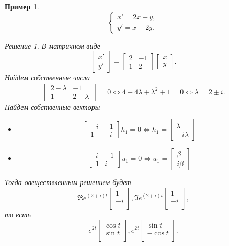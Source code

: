 \documentclass[a5paper, 11pt]{article}
\theoremstyle{definition}
\theoremstyle{plain}
\newtheorem{Ex}{Пример}
\theoremstyle{remark}
\newtheorem*{Solution}{Решение}
\begin{document}
	\begin{Ex}
		\[
		\begin{cases}
		x' = 2x-y, \\
		y'=x+2y.
	\end{cases}
		\]
		\begin{Solution}
			В матричном виде
			\[
			\begin{bmatrix}
				x'\\y'
			\end{bmatrix} = 
		\begin{bmatrix}
			2 & -1\\
			1 & 2
		\end{bmatrix}
	\begin{bmatrix}
		x\\ y
	\end{bmatrix}.
			\]
			Найдем собственные числа 
			\[
			\begin{vmatrix}
				2-\lambda & -1\\
				1 & 2-\lambda
			\end{vmatrix} = 0 \Leftrightarrow 
			4-4\lambda + \lambda^2 + 1 = 0 \Leftrightarrow \lambda = 2 \pm i.
			\]
			Найдем собственные векторы
			\begin{itemize}
				\item[$\boxed{\lambda=2+i}$] 
				\[
				\begin{bmatrix}
				-i & -1\\
				1 & -i
				\end{bmatrix}h_1 = 0 \Leftrightarrow h_1 = \begin{bmatrix}
				\lambda\\
				-i\lambda 
				\end{bmatrix}
				\]			
							\item[$\boxed{\lambda=2-i}$] 
				\[
				\begin{bmatrix}
				i & -1\\
				1 & i
				\end{bmatrix}u_1 = 0 \Leftrightarrow u_1 = \begin{bmatrix}
				\beta\\
				i\beta
				\end{bmatrix}
				\]			
			\end{itemize}
			Тогда овеществленным решением будет 
				\[
				\Re{e^{(2+i)t}
			\begin{bmatrix}
				1\\
				-i\\
			\end{bmatrix}},
		\Im{e^{(2+i)t}
			\begin{bmatrix}
				1\\
				-i\\
		\end{bmatrix}},
			\]
			то есть
				\[
			e^{2t}
				\begin{bmatrix}
					\cos t\\
					\sin t\\
			\end{bmatrix},
			e^{2t}
				\begin{bmatrix}
					\sin t\\
					-\cos t\\
			\end{bmatrix}.
			\]
			

\end{Solution}
\end{Ex}
\end{document}
